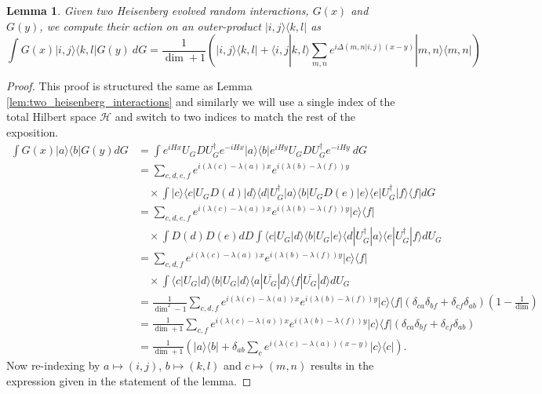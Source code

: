 \documentclass{article}
\newtheorem{lemma}[theorem]{Lemma}
\newcommand{\ket}[1]{|#1\rangle}
\newcommand{\bra}[1]{\langle #1|}
\newcommand{\braket}[2]{\langle #1|#2\rangle}
\newcommand{\ketbra}[2]{| #1\rangle\! \langle #2|}
\newcommand{\parens}[1]{\left( #1 \right)}
\newcommand{\hilb}{\mathcal{H}}
\begin{document}
\begin{lemma} \label{lem:sandwiched_interaction}
    Given two Heisenberg evolved random interactions, $G(x)$ and $G(y)$, we compute their action on an outer-product $\ketbra{i,j}{k,l}$ as
    \begin{equation}
        \int G(x) \ketbra{i,j}{k,l} G(y) ~dG = \frac{1}{\dim + 1} \parens{\ketbra{i,j}{k,l} + \braket{i,j}{k,l} \sum_{m,n} e^{i \Delta(m,n | i,j) (x-y)} \ketbra{m,n}{m,n}}
    \end{equation}
\end{lemma}
\begin{proof}
This proof is structured the same as Lemma \ref{lem:two_heisenberg_interactions} and similarly we will use a single index of the total Hilbert space $\hilb$ and switch to two indices to match the rest of the exposition.
    \begin{align}
        \int G(x) \ketbra{a}{b} G(y) dG &=  \int e^{i H x} U_G D U_G^{\dagger} e^{-i H x} \ketbra{a}{b} e^{i H y} U_G D U_G^\dagger e^{-i H y} ~dG \\
        &= \sum_{c, d, e, f} e^{i (\lambda(c) - \lambda(a))x} e^{i (\lambda(b) - \lambda(f))y} \nonumber \\
        &\quad \times \int \ketbra{c}{c} U_G D(d) \ketbra{d}{d} U_G^\dagger \ketbra{a}{b} U_G D(e) \ketbra{e}{e} U_G^\dagger \ketbra{f}{f} dG \\
        &= \sum_{c, d, e, f}  e^{i (\lambda(c) - \lambda(a))x} e^{i (\lambda(b) - \lambda(f))y} \ketbra{c}{f} \nonumber \\
        &\quad \times \int D(d) D(e) dD \int \bra{c} U_G \ket{d} \bra{b} U_G \ket{e} \bra{d} U_G^\dagger \ket{a} \bra{e} U_G^\dagger \ket{f} dU_G \\
        &=  \sum_{c,d,f} e^{i (\lambda(c) - \lambda(a))x} e^{i (\lambda(b) - \lambda(f))y} \ketbra{c}{f} \nonumber \\ 
        &\quad \times \int \bra{c} U_G \ket{d} \bra{b} U_G \ket{d} \bra{a} \overline{U_G} \ket{d} \bra{f} \overline{U_G} \ket{d} dU_G \\
        &= \frac{1}{\dim^2 - 1} \sum_{c,d,f} e^{i (\lambda(c) - \lambda(a))x} e^{i (\lambda(b) - \lambda(f))y} \ketbra{c}{f} (\delta_{ca} \delta_{bf} + \delta_{cf}\delta_{ab})\parens{1 - \frac{1}{\dim}} \\
        &= \frac{1}{\dim + 1} \sum_{c,f} e^{i (\lambda(c) - \lambda(a))x} e^{i (\lambda(b) - \lambda(f))y} \ketbra{c}{f} (\delta_{ca} \delta_{bf} + \delta_{cf}\delta_{ab}) \\
        &= \frac{1}{\dim + 1} \parens{\ketbra{a}{b} + \delta_{ab} \sum_{c} e^{i(\lambda(c) - \lambda(a))(x-y)} \ketbra{c}{c} }.
    \end{align}
    Now re-indexing by $a \mapsto (i,j)$, $b \mapsto (k,l)$ and $c \mapsto (m,n)$ results in the expression given in the statement of the lemma.
\end{proof}
\end{document}
